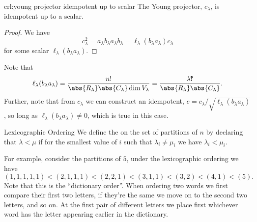 \documentclass[fleqn]{NotesClass}
\newcommand{\rowGroup}{R}
\newcommand{\columnGroup}{C}
\newcommand{\intterobang}{\mathchoice{!\mkern-6.1mu?}{!\mkern-6.2mu?}{!\mkern-6.8mu?}{!\mkern-6.8mu?}}
\begin{document}
    \begin{crl}{}{crl:young projector idempotent up to scalar}
        The Young projector, \(c_\lambda\), is idempotent up to a scalar.
        \begin{proof}
            We have
            \begin{equation}
                c_\lambda^2 = a_\lambda b_\lambda a_\lambda b_\lambda = \ell_\lambda(b_\lambda a_\lambda) c_\lambda
            \end{equation}
            for some scalar \(\ell_\lambda(b_\lambda a_\lambda)\).
        \end{proof}
    \end{crl}
    
    Note that
    \begin{equation}
        \ell_\lambda(b_\lambda a_\lambda) = \frac{n!}{\abs{\rowGroup_\lambda} \abs{\columnGroup_\lambda} \dim V_\lambda} = \frac{\lambda \intterobang}{\abs{\rowGroup_\lambda} \abs{\columnGroup_\lambda}}.
    \end{equation}
    Further, note that from \(c_\lambda\) we can construct an idempotent, \(e = c_\lambda/\sqrt{\ell_\lambda(b_\lambda a_\lambda)}\), so long as \(\ell_\lambda(b_\lambda a_\lambda) \ne 0\), which is true in this case.
    
    \begin{dfn}{Lexicographic Ordering}{}
        We define the  on the set of partitions of \(n\) by declaring that \(\lambda < \mu\) if for the smallest value of \(i\) such that \(\lambda_i \ne \mu_i\) we have \(\lambda_i < \mu_i\).
    \end{dfn}
    
    For example, consider the partitions of \(5\), under the lexicographic ordering we have
    \begin{equation}
        (1,1,1,1,1) < (2,1,1,1) < (2,2,1) < (3,1,1) < (3,2) < (4,1) < (5).
    \end{equation}
    Note that this is the \enquote{dictionary order}.
    When ordering two words we first compare their first two letters, if they're the same we move on to the second two letters, and so on.
    At the first pair of different letters we place first whichever word has the letter appearing earlier in the dictionary.
    
\end{document}
